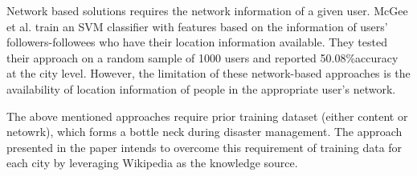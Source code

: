 Network based solutions requires the network information of a given user. McGee et al. \cite{mcgee2013location} train an SVM classifier with features based on the information of users' followers-followees who have their location information available. They tested their approach on a random sample of 1000 users and reported 50.08\%accuracy at the city level. However, the limitation of these network-based approaches is the availability of location information of people in the appropriate user's network.   

The above mentioned approaches require prior training dataset (either content or netowrk), which forms a bottle neck during disaster management. The approach presented in the paper intends to overcome this requirement of training data for each city by leveraging Wikipedia as the knowledge source.
